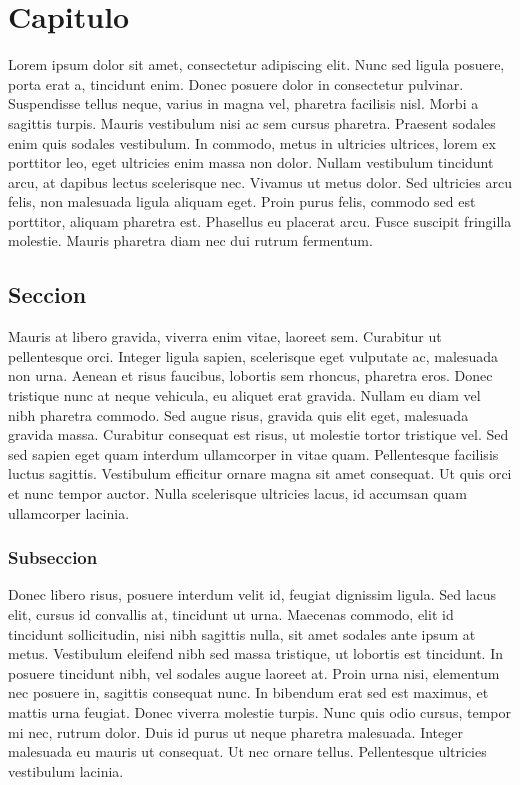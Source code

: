 \chapter{Capitulo}\label{cap.introduccion}


Lorem ipsum dolor sit amet, consectetur adipiscing elit. Nunc sed ligula posuere, porta erat a, tincidunt enim. 
Donec posuere dolor in consectetur pulvinar. Suspendisse tellus neque, varius in magna vel, pharetra facilisis nisl. 
Morbi a sagittis turpis. Mauris vestibulum nisi ac sem cursus pharetra. Praesent sodales enim quis sodales vestibulum. 
In commodo, metus in ultricies ultrices, lorem ex porttitor leo, eget ultricies enim massa non dolor. Nullam vestibulum 
tincidunt arcu, at dapibus lectus scelerisque nec. Vivamus ut metus dolor. Sed ultricies arcu felis, non malesuada ligula 
aliquam eget. Proin purus felis, commodo sed est porttitor, aliquam pharetra est. Phasellus eu placerat arcu. Fusce suscipit 
fringilla molestie. Mauris pharetra diam nec dui rutrum fermentum. 

\section{Seccion}

Mauris at libero gravida, viverra enim vitae, laoreet sem. Curabitur ut pellentesque orci. Integer ligula sapien, scelerisque 
eget vulputate ac, malesuada non urna. Aenean et risus faucibus, lobortis sem rhoncus, pharetra eros. Donec tristique nunc at 
neque vehicula, eu aliquet erat gravida. Nullam eu diam vel nibh pharetra commodo. Sed augue risus, gravida quis elit eget, 
malesuada gravida massa. Curabitur consequat est risus, ut molestie tortor tristique vel. Sed sed sapien eget quam interdum 
ullamcorper in vitae quam. Pellentesque facilisis luctus sagittis. Vestibulum efficitur ornare magna sit amet consequat. Ut 
quis orci et nunc tempor auctor. Nulla scelerisque ultricies lacus, id accumsan quam ullamcorper lacinia. 

\subsection{Subseccion}

Donec libero risus, posuere interdum velit id, feugiat dignissim ligula. Sed lacus elit, cursus id convallis at, tincidunt 
ut urna. Maecenas commodo, elit id tincidunt sollicitudin, nisi nibh sagittis nulla, sit amet sodales ante ipsum at metus. 
Vestibulum eleifend nibh sed massa tristique, ut lobortis est tincidunt. In posuere tincidunt nibh, vel sodales augue laoreet 
at. Proin urna nisi, elementum nec posuere in, sagittis consequat nunc. In bibendum erat sed est maximus, et mattis urna feugiat. 
Donec viverra molestie turpis. Nunc quis odio cursus, tempor mi nec, rutrum dolor. Duis id purus ut neque pharetra malesuada. 
Integer malesuada eu mauris ut consequat. Ut nec ornare tellus. Pellentesque ultricies vestibulum lacinia. 

